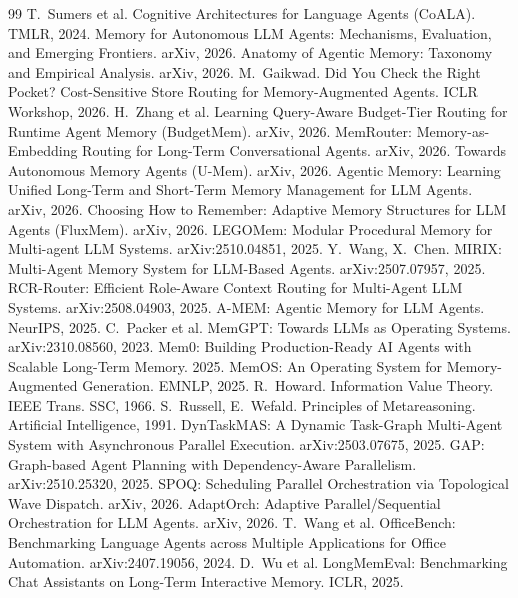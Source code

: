 \documentclass[10pt,twocolumn]{article}
\begin{document}
\begin{thebibliography}{99}\small
\setlength{\itemsep}{1pt}
 T.~Sumers et al. Cognitive Architectures for Language Agents (CoALA). TMLR, 2024.
 Memory for Autonomous LLM Agents: Mechanisms, Evaluation, and Emerging Frontiers. arXiv, 2026.
 Anatomy of Agentic Memory: Taxonomy and Empirical Analysis. arXiv, 2026.
 M.~Gaikwad. Did You Check the Right Pocket? Cost-Sensitive Store Routing for Memory-Augmented Agents. ICLR Workshop, 2026.
 H.~Zhang et al. Learning Query-Aware Budget-Tier Routing for Runtime Agent Memory (BudgetMem). arXiv, 2026.
 MemRouter: Memory-as-Embedding Routing for Long-Term Conversational Agents. arXiv, 2026.
 Towards Autonomous Memory Agents (U-Mem). arXiv, 2026.
 Agentic Memory: Learning Unified Long-Term and Short-Term Memory Management for LLM Agents. arXiv, 2026.
 Choosing How to Remember: Adaptive Memory Structures for LLM Agents (FluxMem). arXiv, 2026.
 LEGOMem: Modular Procedural Memory for Multi-agent LLM Systems. arXiv:2510.04851, 2025.
 Y.~Wang, X.~Chen. MIRIX: Multi-Agent Memory System for LLM-Based Agents. arXiv:2507.07957, 2025.
 RCR-Router: Efficient Role-Aware Context Routing for Multi-Agent LLM Systems. arXiv:2508.04903, 2025.
 A-MEM: Agentic Memory for LLM Agents. NeurIPS, 2025.
 C.~Packer et al. MemGPT: Towards LLMs as Operating Systems. arXiv:2310.08560, 2023.
 Mem0: Building Production-Ready AI Agents with Scalable Long-Term Memory. 2025.
 MemOS: An Operating System for Memory-Augmented Generation. EMNLP, 2025.
 R.~Howard. Information Value Theory. IEEE Trans. SSC, 1966.
 S.~Russell, E.~Wefald. Principles of Metareasoning. Artificial Intelligence, 1991.
 DynTaskMAS: A Dynamic Task-Graph Multi-Agent System with Asynchronous Parallel Execution. arXiv:2503.07675, 2025.
 GAP: Graph-based Agent Planning with Dependency-Aware Parallelism. arXiv:2510.25320, 2025.
 SPOQ: Scheduling Parallel Orchestration via Topological Wave Dispatch. arXiv, 2026.
 AdaptOrch: Adaptive Parallel/Sequential Orchestration for LLM Agents. arXiv, 2026.
 T.~Wang et al. OfficeBench: Benchmarking Language Agents across Multiple Applications for Office Automation. arXiv:2407.19056, 2024.
 D.~Wu et al. LongMemEval: Benchmarking Chat Assistants on Long-Term Interactive Memory. ICLR, 2025.
\end{thebibliography}
\end{document}
